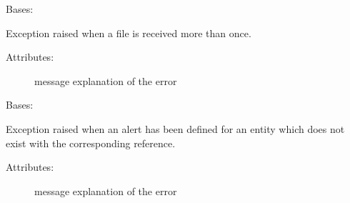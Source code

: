 
\begin{fulllineitems}
\label{\detokenize{eboa.engine:eboa.engine.errors.SourceAlreadyIngested}}
Bases: {\hyperref[\detokenize{eboa.engine:eboa.engine.errors.Error}]{}}

Exception raised when a file is received more than once.
\begin{description}
\item[{Attributes:}] \leavevmode
message \textendash{} explanation of the error

\end{description}

\end{fulllineitems}


\begin{fulllineitems}
\label{\detokenize{eboa.engine:eboa.engine.errors.UndefinedEntityReference}}
Bases: {\hyperref[\detokenize{eboa.engine:eboa.engine.errors.Error}]{}}

Exception raised when an alert has been defined for an entity which does not exist with the corresponding reference.
\begin{description}
\item[{Attributes:}] \leavevmode
message \textendash{} explanation of the error

\end{description}

\end{fulllineitems}


